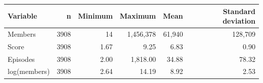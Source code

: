 \begin{tabular}{lrrrrr}
\toprule
Variable & n & Minimum & Maximum & Mean & Standard deviation
\\
\midrule
Members & 3908 & 14 & 1,456,378 & 61,940 & 128,709
\\
Score & 3908 & 1.67 & 9.25 & 6.83 & 0.90
\\
Episodes & 3908 & 2.00 & 1,818.00 & 34.88 & 78.32
\\
log(members) & 3908 & 2.64 & 14.19 & 8.92 & 2.53
\\
\bottomrule
\end{tabular}
